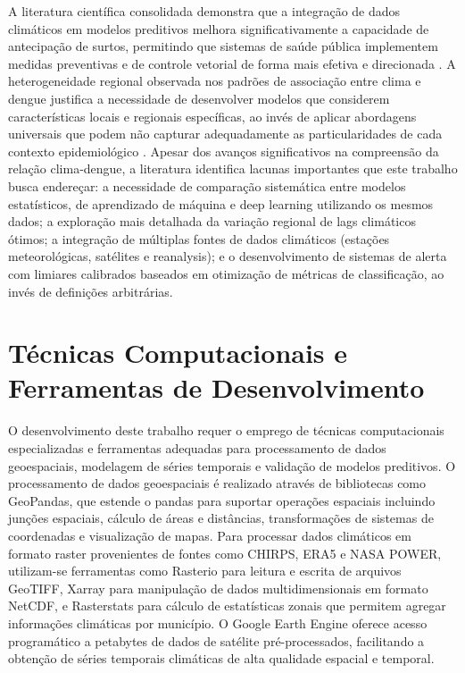A literatura científica consolidada demonstra que a integração de dados climáticos em modelos preditivos melhora significativamente a capacidade de antecipação de surtos, permitindo que sistemas de saúde pública implementem medidas preventivas e de controle vetorial de forma mais efetiva e direcionada \cite{analysis_climate_factors_dengue,the_occurrence_dengue_weather_brazil}. A heterogeneidade regional observada nos padrões de associação entre clima e dengue justifica a necessidade de desenvolver modelos que considerem características locais e regionais específicas, ao invés de aplicar abordagens universais que podem não capturar adequadamente as particularidades de cada contexto epidemiológico \cite{health_impact_dengue_precipitation_sp,the_occurrence_dengue_weather_brazil}. Apesar dos avanços significativos na compreensão da relação clima-dengue, a literatura identifica lacunas importantes que este trabalho busca endereçar: a necessidade de comparação sistemática entre modelos estatísticos, de aprendizado de máquina e deep learning utilizando os mesmos dados; a exploração mais detalhada da variação regional de lags climáticos ótimos; a integração de múltiplas fontes de dados climáticos (estações meteorológicas, satélites e reanalysis); e o desenvolvimento de sistemas de alerta com limiares calibrados baseados em otimização de métricas de classificação, ao invés de definições arbitrárias.

\section{Técnicas Computacionais e Ferramentas de Desenvolvimento}

O desenvolvimento deste trabalho requer o emprego de técnicas computacionais especializadas e ferramentas adequadas para processamento de dados geoespaciais, modelagem de séries temporais e validação de modelos preditivos. O processamento de dados geoespaciais é realizado através de bibliotecas como GeoPandas, que estende o pandas para suportar operações espaciais incluindo junções espaciais, cálculo de áreas e distâncias, transformações de sistemas de coordenadas e visualização de mapas. Para processar dados climáticos em formato raster provenientes de fontes como CHIRPS, ERA5 e NASA POWER, utilizam-se ferramentas como Rasterio para leitura e escrita de arquivos GeoTIFF, Xarray para manipulação de dados multidimensionais em formato NetCDF, e Rasterstats para cálculo de estatísticas zonais que permitem agregar informações climáticas por município. O Google Earth Engine oferece acesso programático a petabytes de dados de satélite pré-processados, facilitando a obtenção de séries temporais climáticas de alta qualidade espacial e temporal.

